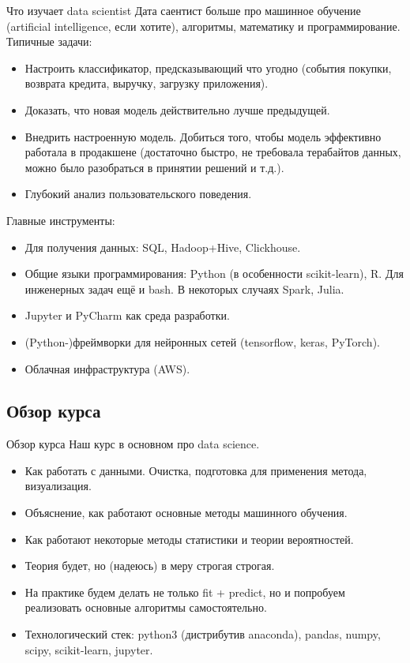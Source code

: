 \documentclass[9pt]{beamer}
\begin{document}
\begin{frame}{Что изучает data scientist}
Дата саентист больше про машинное обучение (artificial intelligence, если хотите), алгоритмы, математику и программирование. Типичные задачи:
\begin{itemize}
    \item Настроить классификатор, предсказывающий что угодно (события покупки, возврата кредита, выручку, загрузку приложения).
    \item Доказать, что новая модель действительно лучше предыдущей.
    \item Внедрить настроенную модель. Добиться того, чтобы модель эффективно работала в продакшене (достаточно быстро, не требовала терабайтов данных, можно было разобраться в принятии решений и т.д.).
    \item Глубокий анализ пользовательского поведения.
\end{itemize}
Главные инструменты:
\begin{itemize}
    \item Для получения данных: SQL, Hadoop+Hive, Clickhouse.
    \item Общие языки программирования: Python (в особенности scikit-learn), R. Для инженерных задач ещё и bash. В некоторых случаях Spark, Julia.
    \item Jupyter и PyCharm как среда разработки.
    \item (Python-)фреймворки для нейронных сетей (tensorflow, keras, PyTorch).
    \item Облачная инфраструктура (AWS).
\end{itemize}
\end{frame}


\subsection{Обзор курса}
\begin{frame}{Обзор курса}
Наш курс в основном про data science.
\begin{itemize}
    \item Как работать с данными. Очистка, подготовка для применения метода, визуализация.
    \item Объяснение, как работают основные методы машинного обучения.
    \item Как работают некоторые методы статистики и теории вероятностей.
    \item Теория будет, но (надеюсь) в меру строгая строгая.
    \item На практике будем делать не только fit + predict, но и попробуем реализовать основные алгоритмы самостоятельно.
    \item Технологический стек: python3 (дистрибутив anaconda), pandas, numpy, scipy, scikit-learn, jupyter.
\end{itemize}
\end{frame}
\end{document}
